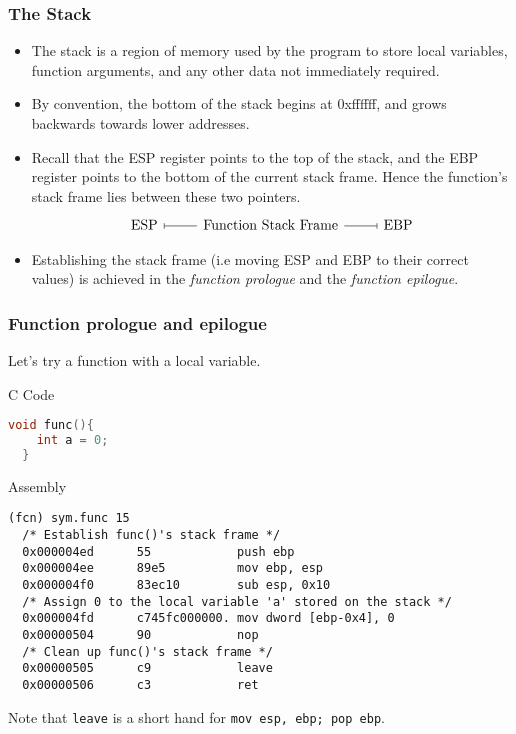 \documentclass{beamer}
\begin{document}
\begin{frame}[fragile]
  \frametitle{The Stack}
  \begin{itemize}
    \item The stack is a region of memory used by the program to store local variables,
    function arguments, and any other data not immediately required.
    \item By convention, the bottom of the stack begins at 0xffffff, and grows
    \alert{backwards} towards lower addresses.
    \item Recall that the ESP register points to the top of the stack, and the
    EBP register points to the bottom of the current stack frame. Hence the function's stack
    frame lies between these two pointers.
    \[
    \begin{tikzcd}
      \text{ESP} \arrow[r, no head, maps to] & \text{Function Stack Frame} & \text{EBP} \arrow[l, no head, maps to]
    \end{tikzcd}
    \]
    \item Establishing the stack frame (i.e moving ESP and EBP to their correct values)
    is achieved in the \textit{function prologue} and the \textit{function epilogue}.
  \end{itemize}
\end{frame}
\begin{frame}[fragile]
  \frametitle{Function prologue and epilogue}
  Let's try a function with a local variable.
  \begin{block}{C Code}
  \begin{lstlisting}[language=C, basicstyle=\small]
  void func(){
    int a = 0;
  }
  \end{lstlisting}
\end{block}
\end{frame}
\begin{frame}[fragile]
\begin{block}{Assembly}
\begin{lstlisting}[basicstyle=\small\ttfamily]
(fcn) sym.func 15
  /* Establish func()'s stack frame */
  0x000004ed      55            push ebp
  0x000004ee      89e5          mov ebp, esp
  0x000004f0      83ec10        sub esp, 0x10
  /* Assign 0 to the local variable 'a' stored on the stack */
  0x000004fd      c745fc000000. mov dword [ebp-0x4], 0
  0x00000504      90            nop
  /* Clean up func()'s stack frame */
  0x00000505      c9            leave
  0x00000506      c3            ret
\end{lstlisting}
\end{block}
Note that \texttt{leave} is a short hand for \texttt{mov esp, ebp; pop ebp}.
\end{frame}
\end{document}
